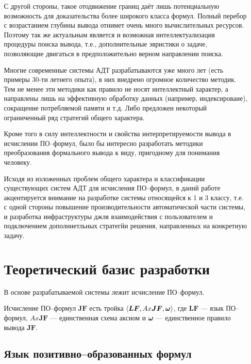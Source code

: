 С другой стороны, такое отодвижение границ даёт лишь потенциальную возможность для доказательства более широкого класса формул. Полный перебор с возрастанием глубины вывода отнимет очень много вычислительных ресурсов. Поэтому так же актуальным является и возможная интеллектуализация процедуры поиска вывода, т.е., дополнительные эвристики о задаче, позволяющие двигаться в предположительно верном направлении поиска.

Многие современные системы АДТ разрабатываются уже много лет (есть примеры 30-ти летнего опыта), в них внедрено огромное количество методик. Тем не менее эти методики как правило не носят интеллектный характер, а направлены лишь на эффективную обработку данных (например, индексироваие), сокращение потребляемой памяти и т.д. Либо предложен некоторый ограниченный ряд стратегий общего характера.

Кроме того в силу интеллектности и свойства интерпретируемости вывода в исчислении ПО--формул, было бы интересно разработать методики преобразования формального вывода к виду, пригодному для понимания человеку.

Исходя из изложенных проблем общего характера и классификации существующих систем АДТ для исчисления ПО--формул, в даннй работе акцентируется внимание на разработке системы относящейся к 1 и 3 классу, т.е. с одной стороны повышение производительности автоматической части системы, и разработка инфраструктуры джля взаимодействия с пользователем и подключением дополниетльных стратегйи решения, направленных на конкретную задачу.


\section{Теоретический базис разработки}

В основе разрабатываемой системы лежит исчисление ПО--формул.

Исчисление ПО--формул $\boldsymbol{JF}$ есть тройка $\left\langle \boldsymbol{LF}, Ax\boldsymbol{JF}, \boldsymbol{\omega} \right\rangle$, где $\boldsymbol{LF}$ --- язык ПО--формул, $Ax\boldsymbol{JF}$ --- единственная схема аксиом и $\boldsymbol{\omega}$ --- единственное правило вывода $\boldsymbol{JF}.$

\subsection{Язык позитивно--образованных формул}

